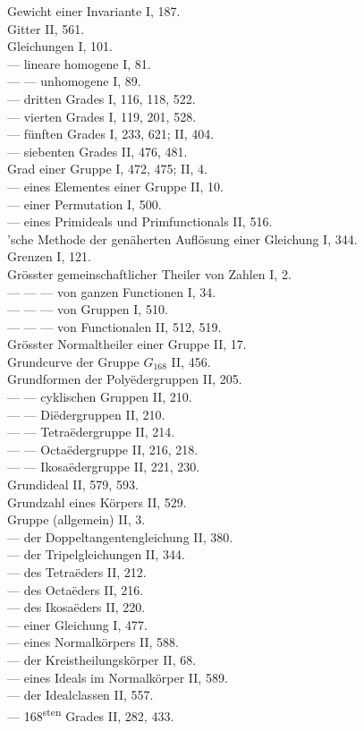 Gewicht einer Invariante I, 187.\\
Gitter II, 561.\\
Gleichungen I, 101.\\
--- lineare homogene I, 81.\\
--- --- unhomogene I, 89.\\
--- dritten Grades I, 116, 118, 522.\\
--- vierten Grades I, 119, 201, 528.\\
--- f\"unften Grades I, 233, 621; II, 404.\\
--- siebenten Grades II, 476, 481.\\
Grad einer Gruppe I, 472, 475; II, 4.\\
--- eines Elementes einer Gruppe II, 10.\\
--- einer Permutation I, 500.\\
--- eines Primideals und Primfunctionals II, 516.\\
'sche Methode der gen\"aherten Aufl\"osung einer Gleichung I, 344.\\
Grenzen I, 121.\\
Gr\"osster gemeinschaftlicher Theiler von Zahlen I, 2.\\
--- --- --- von ganzen Functionen I, 34.\\
--- --- --- von Gruppen I, 510.\\
--- --- --- von Functionalen II, 512, 519.\\
Gr\"osster Normaltheiler einer Gruppe II, 17.\\
Grundcurve der Gruppe $G_{168}$ II, 456.\\
Grundformen der Poly\"edergruppen II, 205.\\
--- --- cyklischen Gruppen II, 210.\\
--- --- Di\"edergruppen II, 210.\\
--- --- Tetra\"edergruppe II, 214.\\
--- --- Octa\"edergruppe II, 216, 218.\\
--- --- Ikosa\"edergruppe II, 221, 230.\\
Grundideal II, 579, 593.\\
Grundzahl eines K\"orpers II, 529.\\
Gruppe (allgemein) II, 3.\\
--- der Doppeltangentengleichung II, 380.\\
--- der Tripelgleichungen II, 344.\\
--- des Tetra\"eders II, 212.\\
--- des Octa\"eders II, 216.\\
--- des Ikosa\"eders II, 220.\\
--- einer Gleichung I, 477.\\
--- eines Normalk\"orpers II, 588.\\
--- der Kreistheilungsk\"orper II, 68.\\
--- eines Ideals im Normalk\"orper II, 589.\\
--- der Idealclassen II, 557.\\
--- 168\textsuperscript{sten} Grades II, 282, 433.\\
